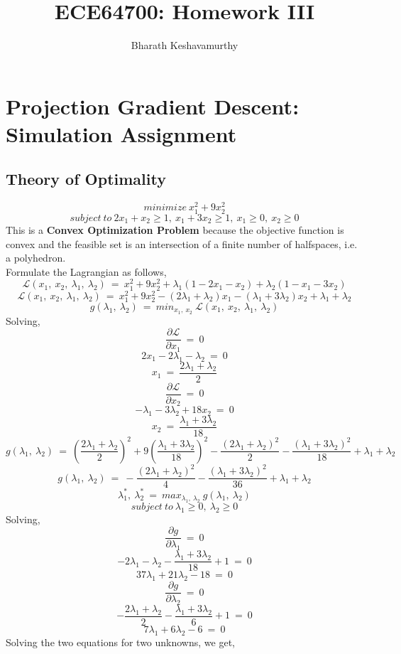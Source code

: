 \documentclass[12pt, draftcls, onecolumn]{IEEEtran}
\begin{document}
 
\title{ECE64700: Homework III}
\author{Bharath Keshavamurthy}
\maketitle
\section{Projection Gradient Descent: Simulation Assignment}
\subsection{Theory of Optimality}
\[minimize\ x_1^2 + 9x_2^2\]
\[subject\ to\ 2x_1 + x_2 \geq 1,\ x_1 + 3x_2 \geq 1,\ x_1 \geq 0,\ x_2 \geq 0\]
This is a \textbf{Convex Optimization Problem} because the objective function is convex and the feasible set is an intersection of a finite number of halfspaces, i.e. a polyhedron.
\\Formulate the Lagrangian as follows,
\[\mathcal{L}(x_1,\ x_2,\ \lambda_1,\ \lambda_2)\ =\ x_1^2 + 9x_2^2 + \lambda_1(1 - 2x_1 - x_2) + \lambda_2(1 - x_1 - 3x_2)\]
\[\mathcal{L}(x_1,\ x_2,\ \lambda_1,\ \lambda_2)\ =\ x_1^2 + 9x_2^2 - (2\lambda_1 + \lambda_2)x_1 - (\lambda_1 + 3\lambda_2)x_2 + \lambda_1 + \lambda_2\]
\[g(\lambda_1,\ \lambda_2)\ =\ min_{x_1,\ x_2}\ \mathcal{L}(x_1,\ x_2,\ \lambda_1,\ \lambda_2)\]
Solving,
\[\frac{\partial \mathcal{L}}{\partial x_1}\ =\ 0\]
\[2x_1 - 2\lambda_1 - \lambda_2\ =\ 0\]
\[x_1\ =\ \frac{2\lambda_1 + \lambda_2}{2}\]
\[\frac{\partial \mathcal{L}}{\partial x_2}\ =\ 0\]
\[-\lambda_1 - 3\lambda_2 + 18x_2\ =\ 0\]
\[x_2\ =\ \frac{\lambda_1 + 3\lambda_2}{18}\]
\[g(\lambda_1,\ \lambda_2)\ =\ (\frac{2\lambda_1 + \lambda_2}{2})^2 + 9(\frac{\lambda_1 + 3\lambda_2}{18})^2 - \frac{(2\lambda_1 + \lambda_2)^2}{2} - \frac{(\lambda_1 + 3\lambda_2)^2}{18} + \lambda_1 + \lambda_2\]
\[g(\lambda_1,\ \lambda_2)\ =\ -\frac{(2\lambda_1 + \lambda_2)^2}{4} - \frac{(\lambda_1 + 3\lambda_2)^2}{36} + \lambda_1 + \lambda_2\]
\clearpage
\[\lambda_1^*,\ \lambda_2^*\ =\ max_{\lambda_1,\ \lambda_2}\ g(\lambda_1,\ \lambda_2)\]
\[subject\ to\ \lambda_1 \geq 0,\ \lambda_2 \geq 0\]
Solving,
\[\frac{\partial g}{\partial \lambda_1}\ =\ 0\]
\[-2\lambda_1 - \lambda_2 - \frac{\lambda_1 + 3\lambda_2}{18} + 1\ =\ 0\]
\[37\lambda_1 + 21\lambda_2 - 18\ =\ 0\]
\[\frac{\partial g}{\partial \lambda_2}\ =\ 0\]
\[-\frac{2\lambda_1 + \lambda_2}{2} - \frac{\lambda_1 + 3\lambda_2}{6} + 1\ =\ 0\]
\[7\lambda_1 + 6\lambda_2 - 6\ =\ 0\]
Solving the two equations for two unknowns, we get,
\end{document}
